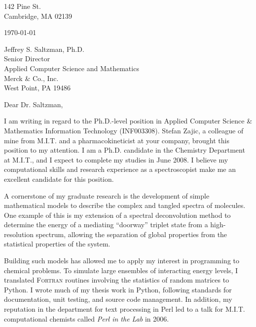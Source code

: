 \documentclass[12pt]{article}
\begin{document}
142 Pine St.\\
Cambridge, MA 02139

\today

Jeffrey S. Saltzman, Ph.D.\\
Senior Director\\
Applied Computer Science and Mathematics\\
Merck \& Co., Inc.\\
West Point, PA 19486

Dear Dr. Saltzman,

I am writing in regard to the Ph.D.-level position in Applied Computer
Science \& Mathematics Information Technology (INF003308).
Stefan Zajic, a colleague of mine from M.I.T. and a pharmacokineticist
at your company, brought this position to my attention.
I am a Ph.D. candidate in the Chemistry Department at M.I.T., and I
expect to complete my studies in June 2008.
I believe my computational skills and research experience as a
spectroscopist make me an excellent candidate for this position.

A cornerstone of my graduate research is the development of simple
mathematical models to describe the complex and tangled spectra of
molecules.
One example of this is my extension of a spectral
deconvolution method to determine the energy of a mediating
``doorway'' triplet state from a high-resolution spectrum, allowing the
separation of global properties from the statistical properties of the
system.

Building such models has allowed me to apply my interest in
programming to chemical problems.  
To simulate large ensembles of interacting energy levels, I translated 
\textsc{Fortran} routines involving the statistics of random matrices 
to Python.
I wrote much of my thesis work in Python, following standards for 
documentation, unit testing, and source code management.
In addition, my reputation in the department for text processing in Perl 
led to a talk for M.I.T. computational chemists called \emph{Perl in the 
Lab} in 2006.
\end{document}

